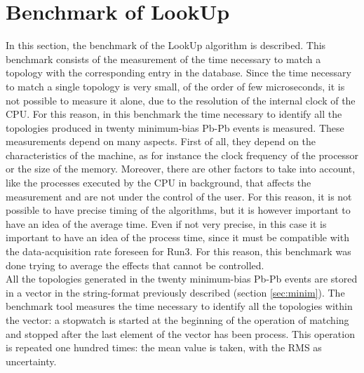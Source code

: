 \section{Benchmark of LookUp}
In this section, the benchmark of the LookUp algorithm is described. This benchmark consists of the measurement of the time necessary to match a topology with the corresponding entry in the database. Since the time necessary to match a single topology is very small, of the order of few microseconds, it is not possible to measure it alone, due to the resolution of the internal clock of the CPU. For this reason, in this benchmark the time necessary to identify all the topologies produced in twenty minimum-bias Pb-Pb events is measured. These measurements depend on many aspects. First of all, they depend on the characteristics of the machine, as for instance the clock frequency of the processor or the size of the memory. Moreover, there are other factors to take into account, like the processes executed by the CPU in background, that affects the measurement and are not under the control of the user. For this reason, it is not possible to have precise timing of the algorithms, but it is however important to have an idea of the average time. Even if not very precise, in this case it is important to have an idea of the process time, since it must be compatible with the data-acquisition rate foreseen for Run3. For this reason, this benchmark was done trying to average the effects that cannot be controlled.\\
All the topologies generated in the twenty minimum-bias Pb-Pb events are stored in a vector in the string-format previously described (section \ref{sec:minim}). The benchmark tool measures the time necessary to identify all the topologies within the vector: a stopwatch is started at the beginning of the operation of matching and stopped after the last element of the vector has been process. This operation is repeated one hundred times: the mean value is taken, with the RMS as uncertainty.
%
